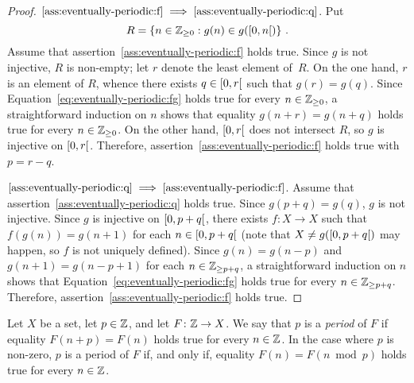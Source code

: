 \begin{proof}
  $\ref{ass:eventually-periodic:f} \implies \ref{ass:eventually-periodic:q}$.
  Put
  $$R = \left\{ n \in \mathbb{Z}_{\ge 0} : g(n) \in g(\left[ 0, n \right[) \right\} \, .$$
  Assume that assertion~\ref{ass:eventually-periodic:f} holds true.
  Since $g$ is not injective, $R$ is non-empty;
  let $r$ denote the least element of~$R$.
  On the one hand, $r$ is an element of $R$,
  whence there exists $q \in \left[ 0, r \right[$ such that $g(r) = g(q)$.
  Since Equation~\eqref{eq:eventually-periodic:fg} holds true for every $n \in \mathbb{Z}_{\ge 0}$,
  a straightforward induction on $n$ shows that equality $g(n + r) = g(n + q)$ holds true for every $n \in \mathbb{Z}_{\ge 0}$.
  On the other hand, $\left[ 0, r \right[$ does not intersect $R$,
  so $g$ is injective on $\left[ 0, r \right[$.
  Therefore, assertion~\ref{ass:eventually-periodic:f} holds true with $p = r - q$.
   
  $\ref{ass:eventually-periodic:q} \implies \ref{ass:eventually-periodic:f}$.
  Assume that assertion~\ref{ass:eventually-periodic:q} holds true.
  Since $g(p + q) = g(q)$, $g$ is not injective.
  Since $g$ is injective on $\left[ 0, p + q \right[$,
  there exists $f\colon X \to X$ such that $f(g(n)) = g(n + 1)$ for each $n \in \left[ 0, p + q \right[$
  (note that $X \ne g(\left[ 0, p + q \right[)$ may happen, so $f$ is not uniquely defined).
  Since  $g(n) = g(n - p) $ and $g(n + 1) = g(n - p + 1)$ for each $n \in \mathbb{Z}_{\ge p + q}$,
  a straightforward induction on $n$ shows that
  Equation~\eqref{eq:eventually-periodic:fg} holds true for every $n \in \mathbb{Z}_{\ge p + q}$.
  Therefore, assertion~\ref{ass:eventually-periodic:f} holds true.
 \end{proof} 

Let $X$ be a set, let $p \in \mathbb{Z}$, and let $F \colon \mathbb{Z} \to X$.
We say that $p$ is a \emph{period} of $F$ if equality $F(n + p)  = F(n)$ holds true for every $n \in \mathbb{Z}$.
In the case where $p$ is non-zero, 
$p$ is a period of $F$ if, and only if, equality $F(n) = F(n \bmod p)$ holds true for every $n \in \mathbb{Z}$.

